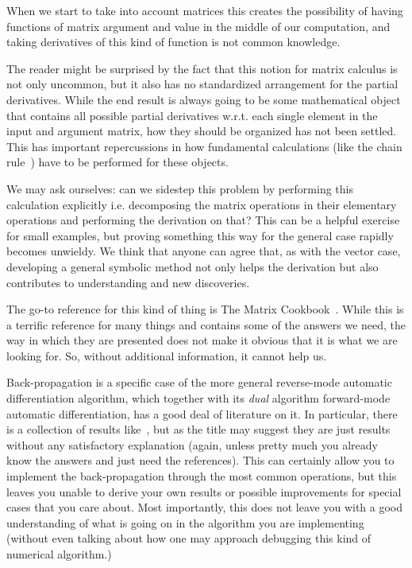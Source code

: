 \documentclass[pdflatex,sn-mathphys-num]{sn-jnl}%
\theoremstyle{thmstyleone}%
\theoremstyle{thmstyletwo}%
\theoremstyle{thmstylethree}%
\begin{document}
When we start to take into account matrices this creates the possibility of
having functions of matrix argument and value in the middle of our computation,
and taking derivatives of this kind of function is not common knowledge.

The reader might be surprised by the fact that this notion for matrix calculus
is not only uncommon, but it also has no standardized arrangement for the partial
derivatives. While the end result is always going to be some mathematical object
that contains all possible partial derivatives w.r.t. each single element in the
input and argument matrix, how they should be organized has not been settled.
This has important repercussions in how fundamental calculations (like the chain
rule~\cite{magnus2010}) have to be performed for these objects.

We may ask ourselves: can we sidestep this problem by performing this
calculation explicitly i.e. decomposing the matrix operations in their
elementary operations and performing the derivation on that? This can be a
helpful exercise for small examples, but proving something this way for the
general case rapidly becomes unwieldy. We think that anyone can agree that, as
with the vector case, developing a general symbolic method not only helps the
derivation but also contributes to understanding and new discoveries.

\iffalse
Now that we have convinced ourselves that we need some robust method to tackle
this matrix derivation task, as humble computer scientists what options do we
have available to us?
\fi

The go-to reference for this kind of thing is The Matrix
Cookbook~\cite{petersen2012}. While this is a terrific reference for many things
and contains some of the answers we need, the way in which they are presented
does not make it obvious that it is what we are looking for. So, without
additional information, it cannot help us.

Back-propagation is a specific case of the more general reverse-mode automatic
differentiation algorithm, which together with its \emph{dual} algorithm
forward-mode automatic differentiation, has a good deal of literature on it. In
particular, there is a collection of results like~\cite{giles2008}, but as the
title may suggest they are just results without any satisfactory explanation
(again, unless pretty much you already know the answers and just need the
references).  This can certainly allow you to implement the back-propagation
through the most common operations, but this leaves you unable to derive your
own results or possible improvements for special cases that you care about. Most
importantly, this does not leave you with a good understanding of what is going
on in the algorithm you are implementing (without even talking about how one may
approach debugging this kind of numerical algorithm.)
\end{document}
